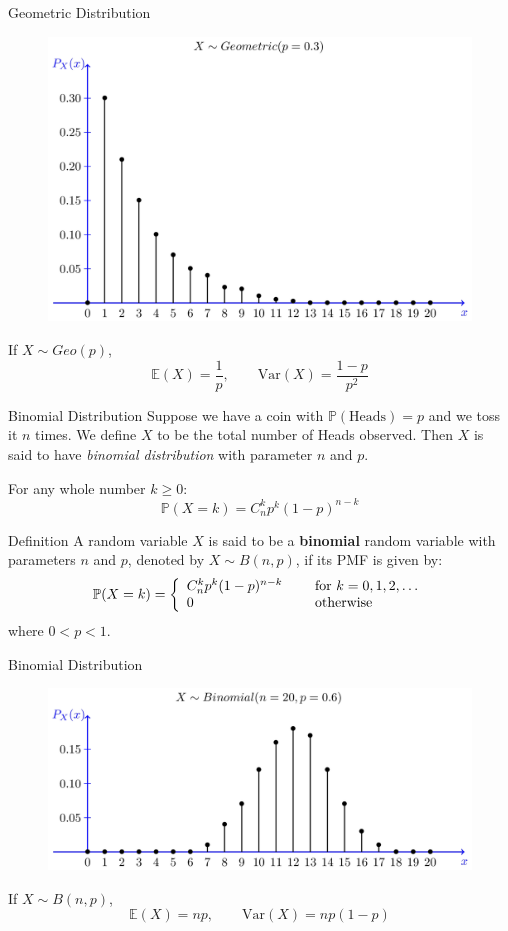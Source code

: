 \documentclass{beamer}
\newcommand{\E}{\mathbb{E}}
\newcommand{\PP}{\mathbb{P}}
\newcommand{\Var}{\text{Var}}
\begin{document}
	
	
	\begin{frame}{Geometric Distribution}
	\begin{figure}
		\centering
		\includegraphics[width=0.6\linewidth]{0.37}
	\end{figure}
	\pause
	If $X\sim Geo(p)$,
	\[ \E(X) = \frac{1}{p},\qquad \Var(X)=\frac{1-p}{p^2} \]
	
		
	\end{frame}
	
	
	
	\begin{frame}{Binomial Distribution}
		Suppose we have a coin with $\PP(\text{Heads})=p$ and we toss it $n$
		times. We define $X$ to be the total number of Heads observed. Then $X$ is said to have \textit{binomial distribution} with parameter $n$
		and $p$.
		
		\pause
		For any whole number $k\ge 0$:
		\[\PP(X=k)=C_n^k p^k(1-p)^{n-k}\]
		\pause
		\begin{block}{Definition}
			A random variable $X$ is said to be a \textbf{binomial} random variable with parameters $n$ and $p$, denoted by $X\sim B(n,p)$, if its PMF is given by:
			\begin{equation}
				\nonumber \PP(X=k) = \left\{
				\begin{array}{l l}
					C_n^k p^k(1-p)^{n-k}& \quad \text{ for } k=0,1,2,\dots\\
					0 & \quad \text{ otherwise}
				\end{array} \right.
			\end{equation}
			where $0<p<1$.
		\end{block}
		
	\end{frame}
	\begin{frame}{Binomial Distribution}
\begin{figure}
	\centering
	\label{fig:0}
	\includegraphics[width=0.6\linewidth]{0.38}
\end{figure}
		\pause
		If $X\sim B(n,p)$,
		\[ \E(X) = np,\qquad \Var(X)=np(1-p) \]
		
		
	\end{frame}
	
\end{document}
